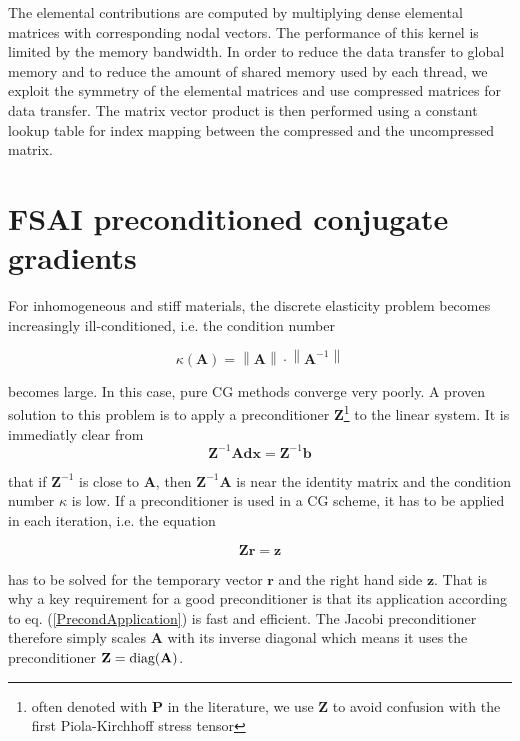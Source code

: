 The elemental contributions are computed by multiplying dense elemental matrices with corresponding nodal vectors. The performance of this kernel is limited by the memory bandwidth. In order to reduce the data transfer to global memory and to reduce the amount of shared memory used by each thread, we exploit the symmetry of the elemental matrices and use compressed matrices for data transfer. The matrix vector product is then performed using a constant lookup table for index mapping between the compressed and the uncompressed matrix.


\section{FSAI preconditioned conjugate gradients}
\label{PCGSection}

For inhomogeneous and stiff materials, the discrete elasticity problem becomes increasingly ill-conditioned, i.e. the condition number

\begin{equation}
\kappa (\mathbf{A}) = \left\| \mathbf{A} \right\|\cdot \left\| \mathbf{A}^{-1} \right\|
\end{equation}

becomes large. In this case, pure CG methods converge very poorly. A proven solution to this problem is to apply a preconditioner $\mathbf{Z}$\footnote{often denoted with $\mathbf P$ in the literature, we use $\mathbf Z$ to avoid confusion with the first Piola-Kirchhoff stress tensor} to the linear system. It is immediatly clear from  
\begin{equation}
\mathbf{Z}^{-1} \mathbf{A} \mathbf{dx} = \mathbf{Z}^{-1} \mathbf{b}
\end{equation}

that if $\mathbf{Z}^{-1}$ is close to $\mathbf{A}$, then $\mathbf{Z}^{-1}\mathbf{A}$ is near the identity matrix and the condition number $\kappa$ is low. If a preconditioner is used in a CG scheme, it has to be applied in each iteration, i.e. the equation

\begin{equation}
 \mathbf{Z} \mathbf{r} = \mathbf{z}
\label{PrecondApplication}
\end{equation}

has to be solved for the temporary vector $\mathbf{r}$ and the right hand side $\mathbf{z}$. That is why a key requirement for a good preconditioner is that its application according to eq. (\ref{PrecondApplication}) is fast and efficient. The Jacobi preconditioner therefore simply scales $\mathbf{A}$ with its inverse diagonal which means it uses the preconditioner $\mathbf{Z} = \textnormal{diag}(\mathbf{A})$.

